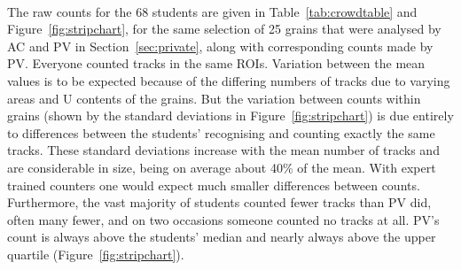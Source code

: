 \documentclass[gchron, manuscript]{copernicus}
\begin{document}
\begin{small}
  \\
\end{small}
\label{tab:crowdtable}

The raw counts for the 68 students are given in
Table~\ref{tab:crowdtable} and Figure~\ref{fig:stripchart}, for the
same selection of 25 grains that were analysed by AC and PV in
Section~\ref{sec:private}, along with corresponding counts made by
PV. Everyone counted tracks in the same ROIs. Variation between the
mean values is to be expected because of the differing numbers of
tracks due to varying areas and U contents of the grains. But the
variation between counts within grains (shown by the standard
deviations in Figure~\ref{fig:stripchart}) is due entirely to
differences between the students' recognising and counting exactly the
same tracks. These standard deviations increase with the mean number
of tracks and are considerable in size, being on average about 40\% of
the mean. With expert trained counters one would expect much smaller
differences between counts.  Furthermore, the vast majority of
students counted fewer tracks than PV did, often many fewer, and on
two occasions someone counted no tracks at all. PV's count is always
above the students' median and nearly always above the upper quartile
(Figure~\ref{fig:stripchart}).\medskip
\end{document}
